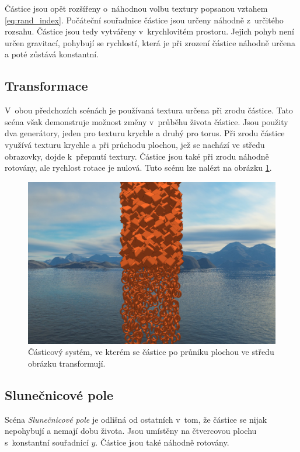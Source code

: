 Částice jsou opět rozšířeny o~náhodnou volbu textury popsanou vztahem \ref{eq:rand_index}. Počáteční souřadnice částice jsou určeny náhodně z~určitého rozsahu. Částice jsou tedy vytvářeny v~krychlovitém prostoru. Jejich pohyb není určen gravitací, pohybují se rychlostí, která je při zrození částice náhodně určena a poté zůstává konstantní.




\subsection*{Transformace}
V~obou předchozích scénách je používaná textura určena při zrodu částice. Tato scéna však demonstruje možnost změny v~průběhu života částice. Jsou použity dva generátory, jeden pro texturu krychle a druhý pro torus. Při zrodu částice využívá texturu krychle a při průchodu plochou, jež se nachází ve středu obrazovky, dojde k~přepnutí textury. Částice jsou také při zrodu náhodně rotovány, ale rychlost rotace je nulová. Tuto scénu lze nalézt na obrázku \ref{fig:ps_transformation}.

\begin{figure}[H]
	\centering
	\includegraphics[width=1.0\textwidth]{obrazky-figures/transformace.png}
	\caption{Částicový systém, ve kterém se částice po průniku plochou ve středu obrázku transformují. }
	\label{fig:ps_transformation}
\end{figure}
\subsection*{Slunečnicové pole}
Scéna \emph{Slunečnicové pole} je odlišná od ostatních v~tom, že částice se nijak nepohybují a nemají dobu života. Jsou umístěny na čtvercovou plochu s~konstantní  souřadnicí $y$. Částice jsou také náhodně rotovány. 

